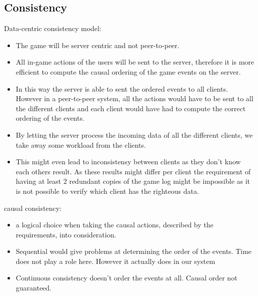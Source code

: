\documentclass{article}
\begin{document}
\subsection{Consistency}
Data-centric consistency model:
\begin{itemize}
	\item The game will be server centric and not peer-to-peer.
	\item All in-game actions of the users will be sent to the server, therefore it is more efficient to compute the causal ordering of the game events on the server. 
	\item In this way the server is able to sent the ordered events to all clients. However in a peer-to-peer system, all the actions would have to be sent to all the different clients and each client would have had to compute the correct ordering of the events. 
	\item By letting the server process the incoming data of all the different clients, we take away some workload from the clients.
	\item This might even lead to inconsistensy between clients as they don't know each others result. As these results might differ per client the requirement of having at least 2 redundant copies of the game log might be impossible as it is not possible to verify which client has the righteous data.
\end{itemize} 

causal consistency:
\begin{itemize}
	\item a logical choice when taking the causal actions, described by the requirements, into consideration.
	\item Sequential would give problems at determining the order of the events. Time does not play a role here. However it actually does in our system
	\item Continuous consistency doesn't order the events at all. Causal order not guaranteed.
\end{itemize}
\newpage




\nocite{*}


\end{document}
